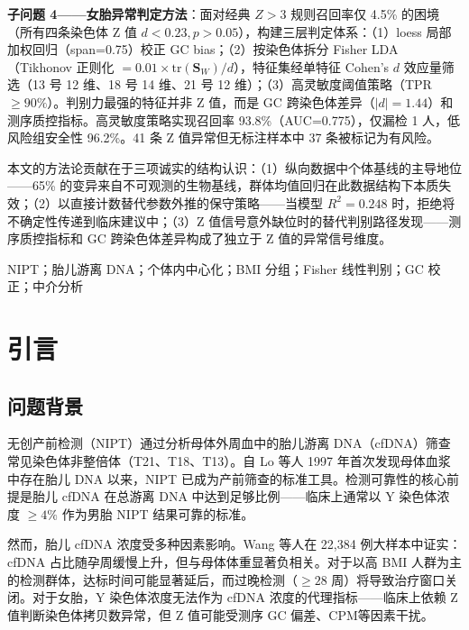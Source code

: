 \documentclass{mcm-paper}
\begin{document}
\textbf{子问题 4——女胎异常判定方法}：面对经典 $Z>3$ 规则召回率仅 4.5\% 的困境（所有四条染色体 Z 值 $d<0.23, p>0.05$），构建三层判定体系：（1）loess 局部加权回归（span=0.75）校正 GC bias；（2）按染色体拆分 Fisher LDA（Tikhonov 正则化 $=0.01\times\mathrm{tr}(\mathbf{S}_W)/d$），特征集经单特征 Cohen's $d$ 效应量筛选（13 号 12 维、18 号 14 维、21 号 12 维）；（3）高灵敏度阈值策略（TPR$\geq 90\%$）。判别力最强的特征并非 Z 值，而是 GC 跨染色体差异（$|d|=1.44$）和测序质控指标。高灵敏度策略实现召回率 93.8\%（AUC=0.775），仅漏检 1 人，低风险组安全性 96.2\%。41 条 Z 值异常但无标注样本中 37 条被标记为有风险。

本文的方法论贡献在于三项诚实的结构认识：（1）纵向数据中个体基线的主导地位——65\% 的变异来自不可观测的生物基线，群体均值回归在此数据结构下本质失效；（2）以直接计数替代参数外推的保守策略——当模型 $R^2=0.248$ 时，拒绝将不确定性传递到临床建议中；（3）Z 值信号意外缺位时的替代判别路径发现——测序质控指标和 GC 跨染色体差异构成了独立于 Z 值的异常信号维度。

\vspace{1em}
NIPT；胎儿游离 DNA；个体内中心化；BMI 分组；Fisher 线性判别；GC 校正；中介分析

\section{引言}

\subsection{问题背景}

无创产前检测（NIPT）通过分析母体外周血中的胎儿游离 DNA（cfDNA）筛查常见染色体非整倍体（T21、T18、T13）。自 Lo 等人 1997 年首次发现母体血浆中存在胎儿 DNA 以来\cite{lo1997}，NIPT 已成为产前筛查的标准工具。检测可靠性的核心前提是胎儿 cfDNA 在总游离 DNA 中达到足够比例——临床上通常以 Y 染色体浓度 $\geq 4\%$ 作为男胎 NIPT 结果可靠的标准。

然而，胎儿 cfDNA 浓度受多种因素影响。Wang 等人在 22,384 例大样本中证实\cite{wang2013}：cfDNA 占比随孕周缓慢上升，但与母体体重显著负相关。对于以高 BMI 人群为主的检测群体，达标时间可能显著延后，而过晚检测（$\geq 28$ 周）将导致治疗窗口关闭。对于女胎，Y 染色体浓度无法作为 cfDNA 浓度的代理指标——临床上依赖 Z 值判断染色体拷贝数异常，但 Z 值可能受测序 GC 偏差、CPM\cite{grati2014}等因素干扰。
\end{document}

